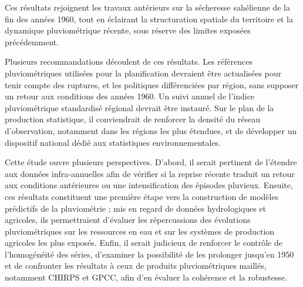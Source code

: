 \documentclass[12pt,a4paper]{report}
\begin{document}
Ces résultats rejoignent les travaux antérieurs sur la sécheresse sahélienne de la fin des années 1960, tout en éclairant la structuration spatiale du territoire et la dynamique pluviométrique récente, sous réserve des limites exposées précédemment.

Plusieurs recommandations découlent de ces résultats. Les références pluviométriques utilisées pour la planification devraient être actualisées pour tenir compte des ruptures, et les politiques différenciées par région, sans supposer un retour aux conditions des années 1960. Un suivi annuel de l’indice pluviométrique standardisé régional devrait être instauré. Sur le plan de la production statistique, il conviendrait de renforcer la densité du réseau d’observation, notamment dans les régions les plus étendues, et de développer un dispositif national dédié aux statistiques environnementales.

Cette étude ouvre plusieurs perspectives. D’abord, il serait pertinent de l’étendre aux données infra-annuelles afin de vérifier si la reprise récente traduit un retour aux conditions antérieures ou une intensification des épisodes pluvieux. Ensuite, ces résultats constituent une première étape vers la construction de modèles prédictifs de la pluviométrie ; mis en regard de données hydrologiques et agricoles, ils permettraient d’évaluer les répercussions des évolutions pluviométriques sur les ressources en eau et sur les systèmes de production agricoles les plus exposés. Enfin, il serait judicieux de renforcer le contrôle de l’homogénéité des séries, d’examiner la possibilité de les prolonger jusqu’en 1950 et de confronter les résultats à ceux de produits pluviométriques maillés, notamment CHIRPS et GPCC, afin d’en évaluer la cohérence et la robustesse.

\clearpage
{}
\setcounter{page}{\numexpr\value{frontmatterpage}+1\relax}
\end{document}
